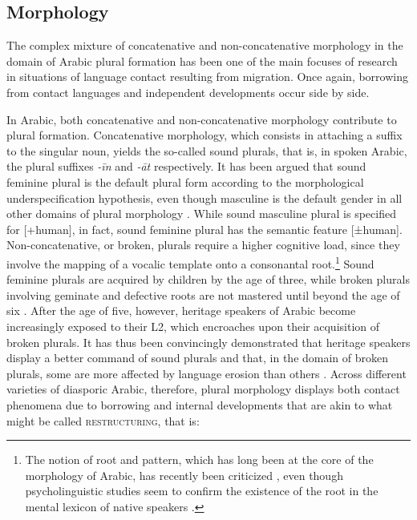 \documentclass[output=paper]{langsci/langscibook}
\begin{document}
 
 \subsection{Morphology}


The complex mixture of concatenative and non-concatenative morphology in the domain of Arabic plural formation has been one of the main focuses of research in situations of language contact resulting from migration. Once again, borrowing from contact languages and independent developments occur side by side.

In Arabic, both concatenative and non-concatenative morphology contribute to plural formation. Concatenative morphology, which consists in attaching a suffix to the singular noun, yields the so-called sound plurals, that is, in spoken Arabic, the plural suffixes \textit{{}-īn} and \textit{{}-āt} respectively. It has been argued that sound feminine plural is the default plural form according to the morphological underspecification hypothesis, even though masculine is the default gender in all other domains of plural morphology \citep[855–856]{AlbiriniBenmamoun2014}. While sound masculine plural is specified for [+human], in fact, sound feminine plural has the semantic feature [±human]. Non-concatenative, or broken, plurals require a higher cognitive load, since they involve the mapping of a vocalic template onto a consonantal root.\footnote{The notion of root and pattern, which has long been at the core of the morphology of Arabic, has recently been criticized \citep{Ratcliffe2013}, even though psycholinguistic studies seem to confirm the existence of the root in the mental lexicon of native speakers \citep{Boudelaa2013}.} Sound feminine plurals are acquired by children by the age of three, while broken plurals involving geminate and defective roots are not mastered until beyond the age of six \citep[857–858]{AlbiriniBenmamoun2014}.  After the age of five, however, heritage speakers of Arabic become increasingly exposed to their L2, which encroaches upon their acquisition of broken plurals. It has thus been convincingly demonstrated that heritage speakers display a better command of sound plurals and that, in the domain of broken plurals, some are more affected by language erosion than others \citep[858–859]{AlbiriniBenmamoun2014}. Across different varieties of diasporic Arabic, therefore, plural morphology displays both contact phenomena due to borrowing and internal developments that are akin to what might be called \textsc{restructuring}, that is:
\end{document}
